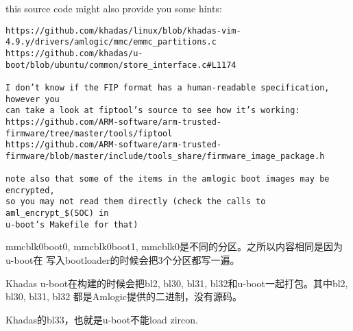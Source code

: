 this source code might also provide you some hints: 
\begin{verbatim}
https://github.com/khadas/linux/blob/khadas-vim-4.9.y/drivers/amlogic/mmc/emmc_partitions.c
https://github.com/khadas/u-boot/blob/ubuntu/common/store_interface.c#L1174

I don’t know if the FIP format has a human-readable specification, however you 
can take a look at fiptool’s source to see how it’s working: 
https://github.com/ARM-software/arm-trusted-firmware/tree/master/tools/fiptool 
https://github.com/ARM-software/arm-trusted-firmware/blob/master/include/tools_share/firmware_image_package.h

note also that some of the items in the amlogic boot images may be encrypted, 
so you may not read them directly (check the calls to aml_encrypt_$(SOC) in 
u-boot’s Makefile for that)
\end{verbatim}

mmcblk0boot0, mmcblk0boot1, mmcblk0是不同的分区。之所以内容相同是因为u-boot在
写入bootloader的时候会把3个分区都写一遍。

Khadas u-boot在构建的时候会把bl2, bl30, bl31, bl32和u-boot一起打包。其中bl2, bl30, bl31, bl32
都是Amlogic提供的二进制，没有源码。

Khadas的bl33，也就是u-boot不能load zircon.
